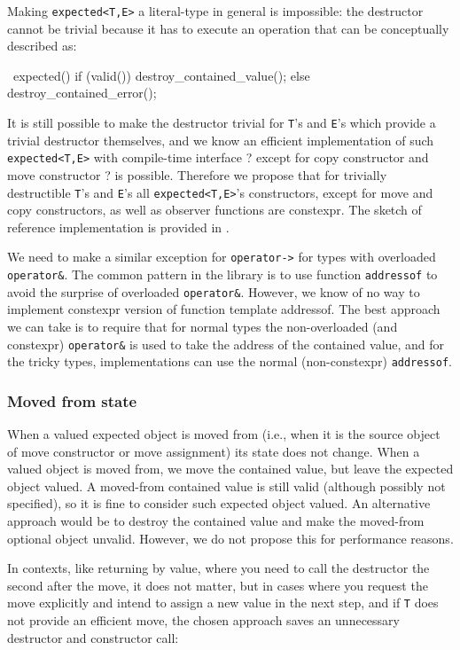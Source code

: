 \documentclass[a4paper,10pt]{article}
\newcommand{\cpp}[1]{\lstinline{#1}}
\begin{document}
Making \cpp{expected<T,E>} a literal-type in general is impossible: the destructor cannot be trivial because it has to execute an operation that can be conceptually described as:

~expected() {
  if (valid()) destroy_contained_value();
  else destroy_contained_error();
}

It is still possible to make the destructor trivial for \cpp{T}'s and \cpp{E}'s which provide a trivial destructor themselves, and we know an efficient implementation of such  \cpp{expected<T,E>}  with compile-time interface ? except for copy constructor and move constructor ? is possible. Therefore we propose that for trivially destructible \cpp{T}'s and \cpp{E}'s all \cpp{expected<T,E>}'s constructors, except for move and copy constructors, as well as observer functions are constexpr. The sketch of reference implementation is provided in \cite{boost.expected}.

We need to make a similar exception for \cpp{operator->} for types with overloaded \cpp{operator&}. The common pattern in the library is to use function \cpp{addressof} to avoid the surprise of overloaded \cpp{operator&}. However, we know of no way to implement constexpr version of function template addressof. The best approach we can take is to require that for normal types the non-overloaded (and constexpr) \cpp{operator&} is used to take the address of the contained value, and for the tricky types, implementations can use the normal (non-constexpr) \cpp{addressof}. 

\subsubsection{Moved from state}

When a valued expected object is moved from (i.e., when it is the source object of move constructor or move assignment) its state does not change. When a valued object is moved from, we move the contained value, but leave the expected object valued. A moved-from contained value is still valid (although possibly not specified), so it is fine to consider such expected object valued. An alternative approach would be to destroy the contained value and make the moved-from optional object unvalid. However, we do not propose this for performance reasons.

In contexts, like returning by value, where you need to call the destructor the second after the move, it does not matter, but in cases where you request the move explicitly and intend to assign a new value in the next step, and if \cpp{T} does not provide an efficient move, the chosen approach saves an unnecessary destructor and constructor call:
\end{document}
